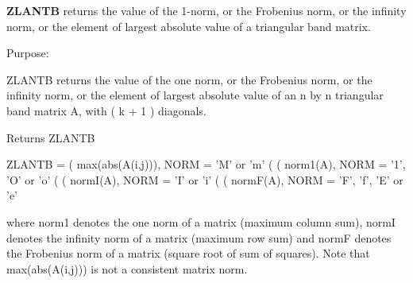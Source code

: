 {\bfseries Z\+L\+A\+N\+T\+B} returns the value of the 1-\/norm, or the Frobenius norm, or the infinity norm, or the element of largest absolute value of a triangular band matrix. 

 \begin{DoxyParagraph}{Purpose\+: }
\begin{DoxyVerb} ZLANTB  returns the value of the one norm,  or the Frobenius norm, or
 the  infinity norm,  or the element of  largest absolute value  of an
 n by n triangular band matrix A,  with ( k + 1 ) diagonals.\end{DoxyVerb}

\end{DoxyParagraph}
\begin{DoxyReturn}{Returns}
Z\+L\+A\+N\+T\+B \begin{DoxyVerb}    ZLANTB = ( max(abs(A(i,j))), NORM = 'M' or 'm'
             (
             ( norm1(A),         NORM = '1', 'O' or 'o'
             (
             ( normI(A),         NORM = 'I' or 'i'
             (
             ( normF(A),         NORM = 'F', 'f', 'E' or 'e'

 where  norm1  denotes the  one norm of a matrix (maximum column sum),
 normI  denotes the  infinity norm  of a matrix  (maximum row sum) and
 normF  denotes the  Frobenius norm of a matrix (square root of sum of
 squares).  Note that  max(abs(A(i,j)))  is not a consistent matrix norm.\end{DoxyVerb}
 
\end{DoxyReturn}


